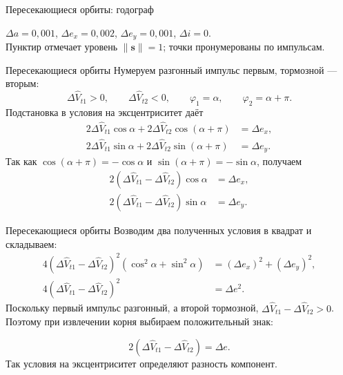 \documentclass[11pt,aspectratio=169,t]{beamer}
\newcommand{\figcaption}[1]{{\usebeamerfont{caption}\color{coursemuted}#1\par}}
\newcommand{\derivationmathspacing}{%
  \setlength{\abovedisplayskip}{2pt}%
  \setlength{\belowdisplayskip}{3pt}%
  \setlength{\abovedisplayshortskip}{2pt}%
  \setlength{\belowdisplayshortskip}{2pt}%
  \setlength{\jot}{2pt}}
\begin{document}
\begin{frame}{Пересекающиеся орбиты: годограф}
\relax
\centering

\par
\figcaption{$\Delta a=0{,}001$, $\Delta e_x=0{,}002$, $\Delta e_y=0{,}001$, $\Delta i=0$.\\
Пунктир отмечает уровень $\|\boldsymbol s\|=1$; точки пронумерованы по импульсам.}
\end{frame}

\begin{frame}{Пересекающиеся орбиты}
\relax
\derivationmathspacing
Нумеруем разгонный импульс первым, тормозной --- вторым:
\[
 \Delta\widehat V_{t1}>0,\qquad\Delta\widehat V_{t2}<0,\qquad
 \varphi_1=\alpha,\qquad\varphi_2=\alpha+\pi.
\]
Подстановка в условия на эксцентриситет даёт
\[
\begin{aligned}
 2\Delta\widehat V_{t1}\cos\alpha
   +2\Delta\widehat V_{t2}\cos(\alpha+\pi)&=\Delta e_x,\\
 2\Delta\widehat V_{t1}\sin\alpha
   +2\Delta\widehat V_{t2}\sin(\alpha+\pi)&=\Delta e_y.
\end{aligned}
\]
Так как $\cos(\alpha+\pi)=-\cos\alpha$ и
$\sin(\alpha+\pi)=-\sin\alpha$, получаем
\[
\begin{aligned}
 2(\Delta\widehat V_{t1}-\Delta\widehat V_{t2})\cos\alpha&=\Delta e_x,\\
 2(\Delta\widehat V_{t1}-\Delta\widehat V_{t2})\sin\alpha&=\Delta e_y.
\end{aligned}
\]
\end{frame}

\begin{frame}{Пересекающиеся орбиты}
\relax
\derivationmathspacing
Возводим два полученных условия в квадрат и складываем:
\[
\begin{aligned}
 4(\Delta\widehat V_{t1}-\Delta\widehat V_{t2})^2
   (\cos^2\alpha+\sin^2\alpha)
   &=(\Delta e_x)^2+(\Delta e_y)^2,\\[2pt]
 4(\Delta\widehat V_{t1}-\Delta\widehat V_{t2})^2&=\Delta e^2.
\end{aligned}
\]
\justifying
Поскольку первый импульс разгонный, а второй тормозной,
$\Delta\widehat V_{t1}-\Delta\widehat V_{t2}>0$.
Поэтому при извлечении корня выбираем положительный знак:
\par
\[
 \boxed{\quad
 2(\Delta\widehat V_{t1}-\Delta\widehat V_{t2})=\Delta e.
 \quad}
\]
Так условия на эксцентриситет определяют разность компонент.
\end{frame}
\end{document}
